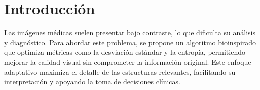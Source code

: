 \chapter{Introducción}
Las imágenes médicas suelen presentar bajo contraste, lo que dificulta su análisis y diagnóstico. Para abordar este problema, se propone un algoritmo bioinspirado que optimiza métricas como la desviación estándar y la entropía, permitiendo mejorar la calidad visual sin comprometer la información original. Este enfoque adaptativo maximiza el detalle de las estructuras relevantes, facilitando su interpretación y apoyando la toma de decisiones clínicas.

